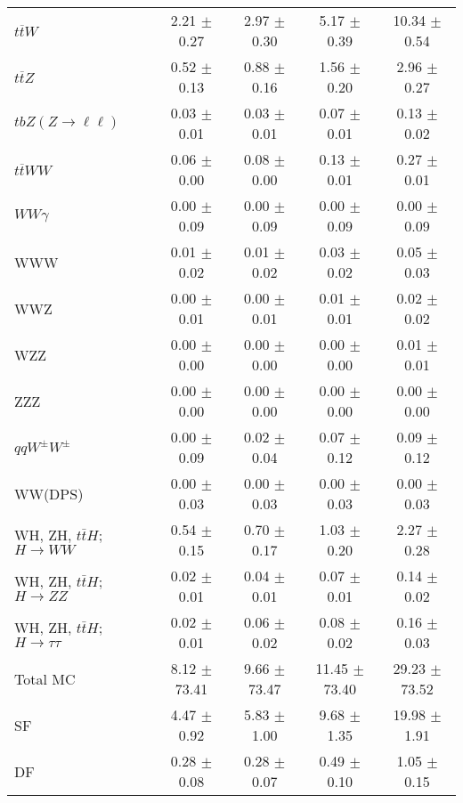\begin{tabular}{l|cccc}
                   $t\overline{t}W$ &  2.21 $\pm$  0.27 &  2.97 $\pm$  0.30 &  5.17 $\pm$  0.39 & 10.34 $\pm$  0.54 \\
                   $t\overline{t}Z$ &  0.52 $\pm$  0.13 &  0.88 $\pm$  0.16 &  1.56 $\pm$  0.20 &  2.96 $\pm$  0.27 \\
    $tbZ (Z \rightarrow \ell \ell)$ &  0.03 $\pm$  0.01 &  0.03 $\pm$  0.01 &  0.07 $\pm$  0.01 &  0.13 $\pm$  0.02 \\
                  $t\overline{t}WW$ &  0.06 $\pm$  0.00 &  0.08 $\pm$  0.00 &  0.13 $\pm$  0.01 &  0.27 $\pm$  0.01 \\
                         $WW\gamma$ &  0.00 $\pm$  0.09 &  0.00 $\pm$  0.09 &  0.00 $\pm$  0.09 &  0.00 $\pm$  0.09 \\
                                WWW &  0.01 $\pm$  0.02 &  0.01 $\pm$  0.02 &  0.03 $\pm$  0.02 &  0.05 $\pm$  0.03 \\
                                WWZ &  0.00 $\pm$  0.01 &  0.00 $\pm$  0.01 &  0.01 $\pm$  0.01 &  0.02 $\pm$  0.02 \\
                                WZZ &  0.00 $\pm$  0.00 &  0.00 $\pm$  0.00 &  0.00 $\pm$  0.00 &  0.01 $\pm$  0.01 \\
                                ZZZ &  0.00 $\pm$  0.00 &  0.00 $\pm$  0.00 &  0.00 $\pm$  0.00 &  0.00 $\pm$  0.00 \\
                 $qqW^{\pm}W^{\pm}$ &  0.00 $\pm$  0.09 &  0.02 $\pm$  0.04 &  0.07 $\pm$  0.12 &  0.09 $\pm$  0.12 \\
                            WW(DPS) &  0.00 $\pm$  0.03 &  0.00 $\pm$  0.03 &  0.00 $\pm$  0.03 &  0.00 $\pm$  0.03 \\
WH, ZH, $t\bar{t}H$; $H \rightarrow WW$ &  0.54 $\pm$  0.15 &  0.70 $\pm$  0.17 &  1.03 $\pm$  0.20 &  2.27 $\pm$  0.28 \\
WH, ZH, $t\bar{t}H$; $H \rightarrow ZZ$ &  0.02 $\pm$  0.01 &  0.04 $\pm$  0.01 &  0.07 $\pm$  0.01 &  0.14 $\pm$  0.02 \\
WH, ZH, $t\bar{t}H$; $H \rightarrow \tau\tau$ &  0.02 $\pm$  0.01 &  0.06 $\pm$  0.02 &  0.08 $\pm$  0.02 &  0.16 $\pm$  0.03 \\
\hline\hline
                           Total MC &  8.12 $\pm$ 73.41 &  9.66 $\pm$ 73.47 & 11.45 $\pm$ 73.40 & 29.23 $\pm$ 73.52 \\
\hline
                                 SF &  4.47 $\pm$  0.92 &  5.83 $\pm$  1.00 &  9.68 $\pm$  1.35 & 19.98 $\pm$  1.91 \\
                                 DF &  0.28 $\pm$  0.08 &  0.28 $\pm$  0.07 &  0.49 $\pm$  0.10 &  1.05 $\pm$  0.15 \\

\end{tabular}
